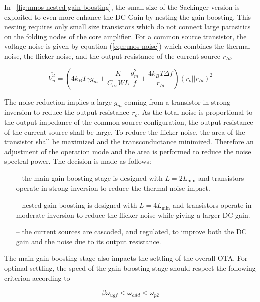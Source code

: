 In \figurename~\ref{fig:nmos-nested-gain-boosting}, the small size of the Sackinger version is exploited to even more enhance the DC Gain by nesting the gain boosting. This nesting requires only small size transistors which do not connect large parasitics on the folding nodes of the core amplifier. For a common source transistor, the voltage noise is given by equation (\ref{eqn:mos-noise}) which combines the thermal noise, the flicker noise, and the output resistance of the current source \(r_{Id} \).

\begin{equation}
    \label{eqn:mos-noise}
\overline{V_n^2} = \left(4k_BT\gamma g_m + \frac{K}{C_{ox}WL} \frac{g_m^2}{f} + \frac{4k_BT\Delta f}{r_{Id}}\right) {(r_o || r_{Id})}^2
\end{equation}

The noise reduction implies a large \(g_m \) coming from a transistor in strong inversion to reduce the output resistance \(r_o\). As the total noise is proportional to the output impedance of the common source configuration, the output resistance of the current source shall be large. To reduce the flicker noise, the area of the transistor shall be maximized and the transconductance minimized. Therefore an adjustment of the operation mode and the area is performed to reduce the noise spectral power. The decision is made as follows:

\begin{itemize}
    \itemsep-0.5em
    \item[--] the main gain boosting stage is designed with \(L=2L_{\min}\) and transistors operate in strong inversion to reduce the thermal noise impact.
    \item[--] nested gain boosting is designed with \(L=4L_{\min}\) and transistors operate in moderate inversion to reduce the flicker noise while giving a larger DC gain.
    \item[--] the current sources are cascoded, and regulated, to improve both the DC gain and the noise due to its output resistance.
\end{itemize}

The main gain boosting stage also impacts the settling of the overall OTA\@. For optimal settling, the speed of the gain boosting stage should respect the following criterion according to~\cite{Bult1991}

\begin{equation}
\beta \omega_{ugf} < \omega_{add} < \omega_{p2}
\end{equation}

